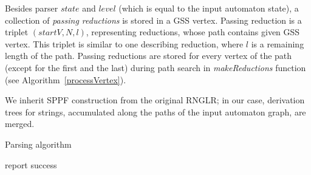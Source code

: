 Besides parser $state$ and $level$ (which is equal to the input automaton state), 
a collection of \emph{passing reductions} is stored in a GSS vertex. Passing reduction is a 
triplet $(startV, N, l)$, representing reductions, whose path contains given GSS vertex. 
This triplet is similar to one describing reduction, where $l$ is a remaining length of the path. 
Passing reductions are stored for every vertex of the path (except for the first and the last) 
during path search in \emph{makeReductions} function (see Algorithm~\ref{processVertex}).

We inherit SPPF construction from the original RNGLR; in our case, 
derivation trees for strings, accumulated along the paths of the input automaton 
graph, are merged. 

\begin{algorithm}[!ht]
\begin{algorithmic}[1]
\caption{Parsing algorithm}
\label{parsing}
     {report success}
    \EndIf
  \Else
    \EndWhile
    \EndIf
  \EndIf
\EndFunction
\end{algorithmic}
\end{algorithm}

